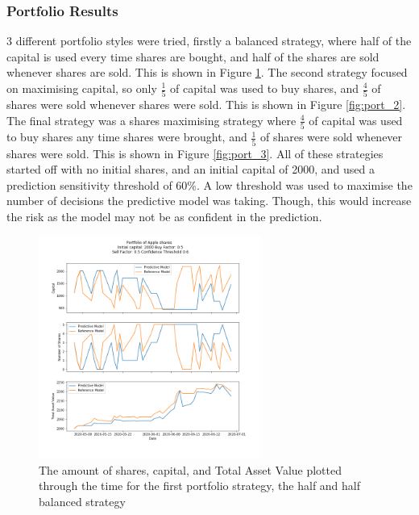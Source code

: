 \subsubsection{Portfolio Results}
3 different portfolio styles were tried, firstly a balanced strategy, where half of the capital is used every time shares are bought, and half of the shares are sold whenever shares are sold. This is shown in Figure \ref{fig:port_1}. The second strategy focused on maximising capital, so only \unboldmath$\frac{1}{5}$ of capital was used to buy shares, and $\frac{4}{5}$ of shares were sold whenever shares were sold. This is shown in Figure \ref{fig:port_2}. The final strategy was a shares maximising strategy where $\frac{4}{5}$ of capital was used to buy shares any time shares were brought, and $\frac{1}{5}$ of shares were sold whenever shares were sold. This is shown in Figure \ref{fig:port_3}. All of these strategies started off with no initial shares, and an initial capital of 2000, and used a prediction sensitivity threshold of 60\%. A low threshold was used to maximise the number of decisions the predictive model was taking. Though, this would increase the risk as the model may not be as confident in the prediction. 

\begin{figure}[H]
	\centering
	\includegraphics[width=0.65\textwidth]{images/portfolio_1.png}
	\caption{The amount of shares, capital, and Total Asset Value plotted through the time for the first portfolio strategy, the half and half balanced strategy}
	\label{fig:port_1}
\end{figure}

